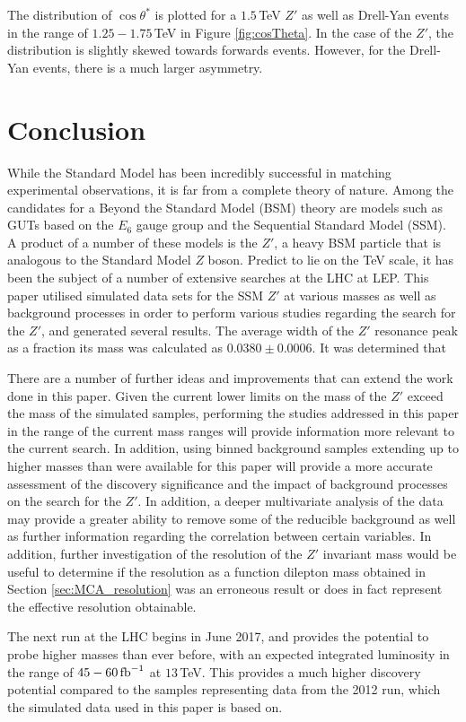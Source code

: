 \documentclass{article}
\begin{document}
The distribution of $\cos\theta^*$ is plotted for a $1.5\,$TeV $Z'$ as well as Drell-Yan events in the range of $1.25-1.75\,$TeV in Figure \ref{fig:cosTheta}. In the case of the $Z'$, the distribution is slightly skewed towards forwards events. However, for the Drell-Yan events, there is a much larger asymmetry. 

\section{Conclusion}
\label{sec:Conclusion}

While the Standard Model has been incredibly successful in matching experimental observations, it is far from a complete theory of nature. Among the candidates for a Beyond the Standard Model (BSM) theory are models such as GUTs based on the $E_6$ gauge group and the Sequential Standard Model (SSM). A product of a number of these models is the $Z'$, a heavy BSM particle that is analogous to the Standard Model $Z$ boson. Predict to lie on the TeV scale, it has been the subject of a number of extensive searches at the LHC at LEP. This paper utilised  simulated data sets for the SSM $Z'$ at various masses as well as background processes in order to perform various studies regarding the search for the $Z'$, and generated several results. The average width of the $Z'$ resonance peak as a fraction its mass was calculated as $0.0380\pm0.0006$. It was determined that 

There are a number of further ideas and improvements that can extend the work done in this paper. Given the current lower limits on the mass of the $Z'$ exceed the mass of the simulated samples, performing the studies addressed in this paper in the range of the current mass ranges will provide information more relevant to the current search. In addition, using binned background samples extending up to higher masses than were available for this paper will provide a more accurate assessment of the discovery significance and the impact of background processes on the search for the $Z'$. %
In addition, a deeper multivariate analysis of the data may provide a greater ability to remove some of the reducible background as well as further information regarding the correlation between certain variables. In addition, further investigation of the resolution of the $Z'$ invariant mass would be useful to determine if the resolution as a function dilepton mass obtained in Section \ref{sec:MCA_resolution} was an erroneous result or does in fact represent the effective resolution obtainable.

The next run at the LHC begins in June 2017, and provides the potential to probe higher masses than ever before, with an expected integrated luminosity in the range of $45-60\,\rm{fb}^{-1}$ at $13\,$TeV. This provides a much higher discovery potential compared to the samples representing data from the 2012 run, which the simulated data used in this paper is based on. 



\end{document}
